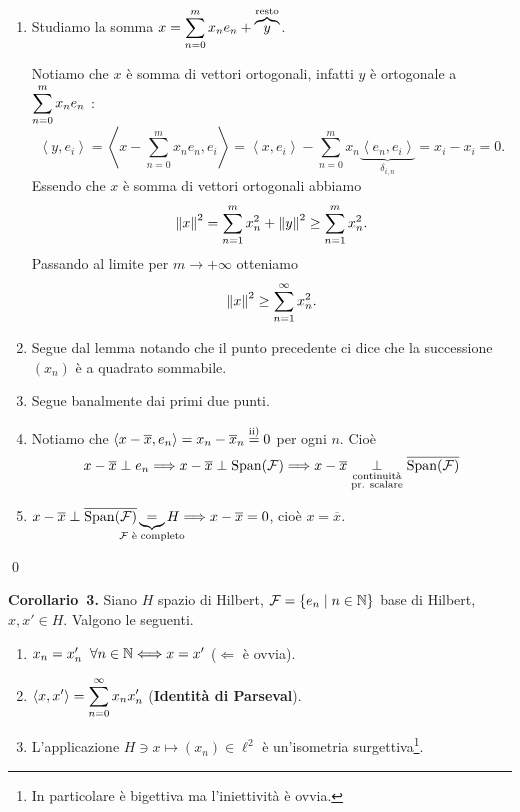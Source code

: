 \begin{enumerate}
\item Studiamo la somma $\displaystyle x = \sum_{n=0}^{m} x_n e_n + \overbrace{y}^{\text{resto}}$.

Notiamo che $x$ è somma di vettori ortogonali, infatti $y$ è ortogonale a $\displaystyle \sum_{n=0}^{m} x_n e_n$ :
%
$$
	\left<y,e_i \right> = \left<x - \sum_{n=0}^{m} x_n e_n, e_i \right>
	= \left<x,e_i \right> - \sum_{n=0}^{m} x_n \underbrace{\left<e_n,e_i \right>}_{\delta_{i,n}} = x_i - x_i = 0.
$$
%
Essendo che $x$ è somma di vettori ortogonali abbiamo
%
$$
	\left\lVert x \right\rVert^2 = \sum_{n=1}^{m} x_n^2 + \left\lVert y \right\rVert^2 \geq \sum_{n=1}^{m} x_n^2.
$$
%
Passando al limite per $m \to +\infty$ otteniamo
%
$$
	\left\lVert x \right\rVert^2 \geq \sum_{n=1}^{\infty} x_n^2. 
$$
%

\item Segue dal lemma notando che il punto precedente ci dice che la successione $(x_n)$ è a quadrato sommabile.

\item Segue banalmente dai primi due punti.

\item Notiamo che $\left<x - \overline{x}, e_n \right> = x_n - \overline{x}_n \overset{\text{ii)}}{=} 0$ per ogni $n$. Cioè
%
$$
	x - \overline{x} \perp e_n \Longrightarrow x - \overline{x} \perp \operatorname{Span}(\mathcal{F})
	\Longrightarrow x - \overline{x} \underset{\substack{\text{continuità} \\ \text{pr. scalare}}}{\perp} \overline{\operatorname{Span}(\mathcal{F})}
$$
%

\item $x - \overline{x} \perp \overline{\spn(\mc{F})} \underbrace{=}_{\mathclap{\text{$\mc{F}$ è completo}}} H \Longrightarrow x - \overline{x} = 0$, cioè $x = \overline{x}$.
\end{enumerate}
\qed

\textbf{Corollario~3.} Siano $H$ spazio di Hilbert, $\mathcal{F} = \left\{ e_n \;\middle|\; n \in \mathbb N \right\}$ base di Hilbert, $x,x' \in H$. Valgono le seguenti.
\begin{enumerate}
\item $x_n = x_n' \;\; \forall n \in \mathbb N \Longleftrightarrow x = x'$ ($\Leftarrow$ è ovvia).

\item $\displaystyle \left<x,x' \right> = \sum_{n=0}^{\infty} x_n  x_n'$ (\textbf{Identità di Parseval}).

\item L'applicazione $H \ni x \mapsto (x_n) \in \ell^2$ è un'isometria surgettiva\footnote{In particolare è bigettiva ma l'iniettività è ovvia.}.
\end{enumerate}

